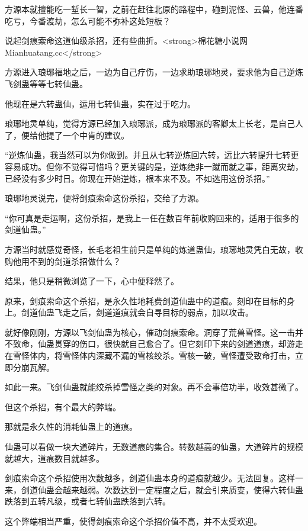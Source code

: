 
\begin{this_body}

方源本就擅能吃一堑长一智，之前在赶往北原的路程中，碰到泥怪、云兽，他连番吃亏，今番渡劫，怎么可能不弥补这处短板？

说起剑痕索命这道仙级杀招，还有些曲折。<strong>棉花糖小说网Mianhuatang.cc</strong>

方源进入琅琊福地之后，一边为自己疗伤，一边求助琅琊地灵，要求他为自己逆炼飞剑蛊等等七转仙蛊。

他现在是六转蛊仙，运用七转仙蛊，实在过于吃力。

琅琊地灵单纯，觉得方源已经加入琅琊派，成为琅琊派的客卿太上长老，是自己人了，便给他提了一个中肯的建议。

“逆炼仙蛊，我当然可以为你做到。并且从七转逆炼回六转，远比六转提升七转更容易成功。但你不觉得可惜吗？更关键的是，逆炼绝非一蹴而就之事，距离灾劫，已经没有多少时日。你现在开始逆炼，根本来不及。不如选用这份杀招。”

琅琊地灵说完，便将剑痕索命这份杀招，交给了方源。

“你可真是走运啊，这份杀招，是我上一任在数百年前收购回来的，适用于很多的剑道仙蛊。”

方源当时就感觉奇怪，长毛老祖生前只是单纯的炼道蛊仙，琅琊地灵凭白无故，收购他用不到的剑道杀招做什么？

结果，他只是稍微浏览了一下，心中便释然了。

原来，剑痕索命这个杀招，是永久性地耗费剑道仙蛊中的道痕。刻印在目标的身上。剑道仙蛊飞走之后，剑道道痕就会自寻目标的弱点，加以攻击。

就好像刚刚，方源以飞剑仙蛊为核心，催动剑痕索命。洞穿了荒兽雪怪。这一击并不致命，仙蛊贯穿的伤口，很快就自己愈合了。但它刻印下来的剑道道痕，却游走在雪怪体内，将雪怪体内深藏不漏的雪核绞杀。雪核一破，雪怪遭受致命打击，立即分崩瓦解。

如此一来。飞剑仙蛊就能绞杀掉雪怪之类的对象。再不会事倍功半，收效甚微了。

但这个杀招，有个最大的弊端。

那就是永久性的消耗仙蛊上的道痕。

仙蛊可以看做一块大道碎片，无数道痕的集合。转数越高的仙蛊，大道碎片的规模就越大，道痕数目就越多。

剑痕索命这个杀招使用次数越多，剑道仙蛊本身的道痕就越少。无法回复。这样一来，剑道仙蛊会越来越弱。次数达到一定程度之后，就会引来质变，使得六转仙蛊跌落到五转凡级，或者七转仙蛊跌落到六转。

这个弊端相当严重，使得剑痕索命这个杀招价值不高，并不太受欢迎。


\end{this_body}
